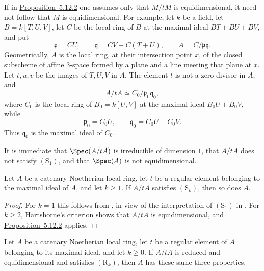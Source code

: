 \begin{remark}[5.12.3]
\label{IV.5.12.3}
If in {\hyperref[IV.5.12.2]{Proposition~5.12.2}} one assumes only that $M/tM$ is
equidimensional, it need not follow that $M$ is
equidimensional.  For example, let $k$ be a field, let
$B=k[T,U,V]$, let $C$ be the local ring of $B$ at the maximal
ideal $BT+BU+BV$, and put
\[
  \mathfrak p=CU,\qquad
  \mathfrak q=CV+C(T+U),\qquad
  A=C/\mathfrak p\mathfrak q.
\]
Geometrically, $A$ is the local ring, at their intersection
point $x$, of the closed subscheme of affine $3$-space formed by
a plane and a line meeting that plane at $x$.  Let $t,u,v$ be the
images of $T,U,V$ in $A$.  The element $t$ is not a zero divisor
in $A$, and
\[
  A/tA\simeq C_0/\mathfrak p_0\mathfrak q_0,
\]
where $C_0$ is the local ring of $B_0=k[U,V]$ at the maximal
ideal $B_0U+B_0V$, while
\[
  \mathfrak p_0=C_0U,\qquad
  \mathfrak q_0=C_0U+C_0V.
\]
  Thus $\mathfrak q_0$ is the maximal ideal of $C_0$.


  It is
immediate that $\Spec(A/tA)$ is irreducible of dimension $1$,
that $A/tA$ does not satisfy $(\mathrm S_1)$, and that
$\Spec(A)$ is not equidimensional.
\end{remark}

\begin{corollary}[5.12.4]
\label{IV.5.12.4}
Let $A$ be a catenary Noetherian local ring, let $t$ be a regular
element belonging to the maximal ideal of $A$, and let $k\geq1$.
If $A/tA$ satisfies $(\mathrm S_k)$, then so does $A$.
\end{corollary}

\begin{proof}
For $k=1$ this follows from , in view of the
interpretation of $(\mathrm S_1)$ in .  For
$k\geq2$, Hartshorne's criterion  shows that
$A/tA$ is equidimensional, and {\hyperref[IV.5.12.2]{Proposition~5.12.2}} applies.
\end{proof}

\begin{proposition}[5.12.5]
\label{IV.5.12.5}
Let $A$ be a catenary Noetherian local ring, let $t$ be a regular
element of $A$ belonging to its maximal ideal, and let $k\geq0$.
If $A/tA$ is reduced and equidimensional and satisfies
$(\mathrm R_k)$, then $A$ has these same three properties.
\end{proposition}

